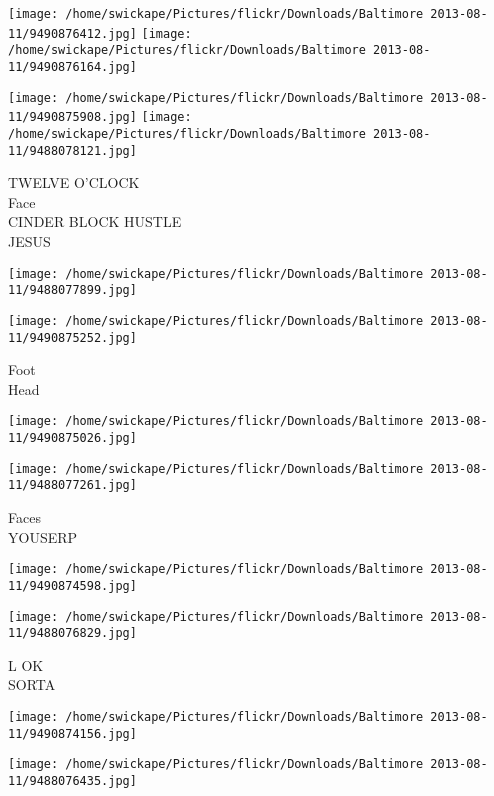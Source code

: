 \documentclass[10pt,letterpaper]{article}
\begin{document}
\texttt{[image: /home/swickape/Pictures/flickr/Downloads/Baltimore 2013-08-11/9490876412.jpg]}
\texttt{[image: /home/swickape/Pictures/flickr/Downloads/Baltimore 2013-08-11/9490876164.jpg]}

\texttt{[image: /home/swickape/Pictures/flickr/Downloads/Baltimore 2013-08-11/9490875908.jpg]}
\texttt{[image: /home/swickape/Pictures/flickr/Downloads/Baltimore 2013-08-11/9488078121.jpg]}

TWELVE O'CLOCK\\
Face\\
CINDER BLOCK HUSTLE\\
JESUS\\
\pagebreak

\texttt{[image: /home/swickape/Pictures/flickr/Downloads/Baltimore 2013-08-11/9488077899.jpg]}

\vspace{0.25in}
\texttt{[image: /home/swickape/Pictures/flickr/Downloads/Baltimore 2013-08-11/9490875252.jpg]}

Foot\\
Head\\
\pagebreak

\texttt{[image: /home/swickape/Pictures/flickr/Downloads/Baltimore 2013-08-11/9490875026.jpg]}

\vspace{0.25in}
\texttt{[image: /home/swickape/Pictures/flickr/Downloads/Baltimore 2013-08-11/9488077261.jpg]}

Faces\\
YOUSERP\\
\pagebreak

\texttt{[image: /home/swickape/Pictures/flickr/Downloads/Baltimore 2013-08-11/9490874598.jpg]}

\vspace{0.25in}
\texttt{[image: /home/swickape/Pictures/flickr/Downloads/Baltimore 2013-08-11/9488076829.jpg]}

L OK\\
SORTA\\
\pagebreak

\texttt{[image: /home/swickape/Pictures/flickr/Downloads/Baltimore 2013-08-11/9490874156.jpg]}

\vspace{0.25in}
\texttt{[image: /home/swickape/Pictures/flickr/Downloads/Baltimore 2013-08-11/9488076435.jpg]}
\end{document}

